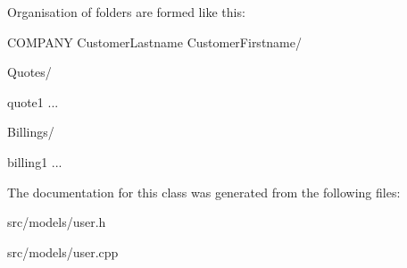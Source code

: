 Organisation of folders are formed like this\+:
\begin{DoxyItemize}
\item C\+O\+M\+P\+A\+N\+Y Customer\+Lastname Customer\+Firstname/
\begin{DoxyItemize}
\item Quotes/
\begin{DoxyItemize}
\item quote1 ...
\end{DoxyItemize}
\item Billings/
\begin{DoxyItemize}
\item billing1 ... 
\end{DoxyItemize}
\end{DoxyItemize}
\end{DoxyItemize}

The documentation for this class was generated from the following files\+:\begin{DoxyCompactItemize}
\item 
src/models/user.\+h\item 
src/models/user.\+cpp\end{DoxyCompactItemize}
